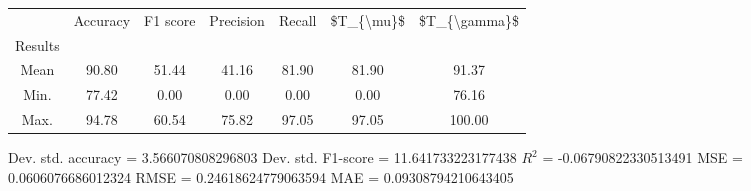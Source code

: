 \begin{tabular}{|c|c|c|c|c|c|c|}
\toprule
{} &  Accuracy &  F1 score &  Precision &  Recall &  \$T\_\{\textbackslash mu\}\$ &  \$T\_\{\textbackslash gamma\}\$ \\
Results &           &           &            &         &            &               \\
\hline
Mean    &     90.80 &     51.44 &      41.16 &   81.90 &      81.90 &         91.37 \\
Min.    &     77.42 &      0.00 &       0.00 &    0.00 &       0.00 &         76.16 \\
Max.    &     94.78 &     60.54 &      75.82 &   97.05 &      97.05 &        100.00 \\
\bottomrule
\end{tabular}

 Dev. std. accuracy = 3.566070808296803
 Dev. std. F1-score = 11.641733223177438
 $R^2$ = -0.06790822330513491
 MSE = 0.0606076686012324
 RMSE = 0.24618624779063594
 MAE = 0.09308794210643405